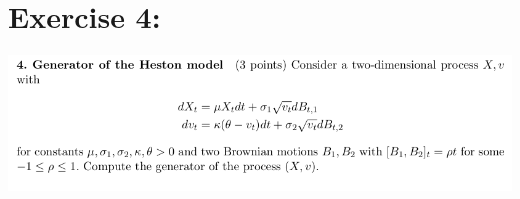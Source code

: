 \documentclass[document.tex]{subfiles}
\begin{document}
\section*{Exercise 4:}


\includegraphics[width=\textwidth]{ex4.png}
\end{document}
